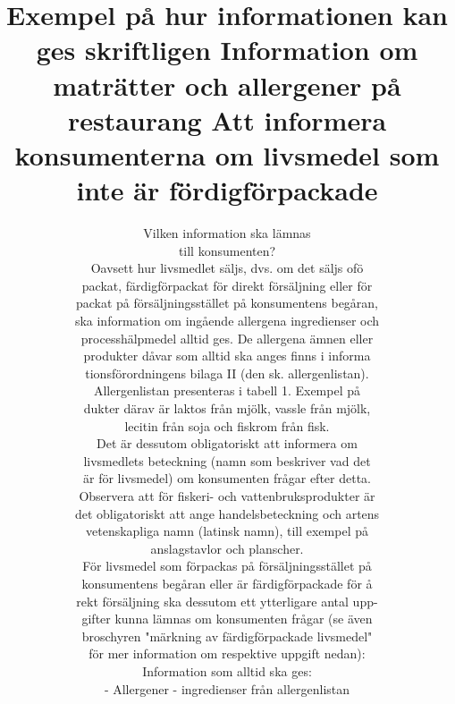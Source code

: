 \title{
Exempel på hur informationen kan ges skriftligen
}

\title{
Information om maträtter och allergener på restaurang
}

\title{
Att informera konsumenterna om livsmedel som inte är fördigförpackade
}
\author{
Vilken information ska lämnas \\ till konsumenten? \\ Oavsett hur livsmedlet säljs, dvs. om det säljs ofö \\ packat, färdigförpackat för direkt försäljning eller för \\ packat på försäljningsstället på konsumentens begåran, \\ ska information om ingående allergena ingredienser och \\ processhälpmedel alltid ges. De allergena ämnen eller \\ produkter dåvar som alltid ska anges finns i informa \\ tionsförordningens bilaga II (den sk. allergenlistan). \\ Allergenlistan presenteras i tabell 1. Exempel på \\ dukter därav är laktos från mjölk, vassle från mjölk, \\ lecitin från soja och fiskrom från fisk. \\ Det är dessutom obligatoriskt att informera om \\ livsmedlets beteckning (namn som beskriver vad det \\ är för livsmedel) om konsumenten frågar efter detta. \\ Observera att för fiskeri- och vattenbruksprodukter är \\ det obligatoriskt att ange handelsbeteckning och artens \\ vetenskapliga namn (latinsk namn), till exempel på \\ anslagstavlor och planscher. \\ För livsmedel som förpackas på försäljningsstället på \\ konsumentens begåran eller är färdigförpackade för å \\ rekt försäljning ska dessutom ett ytterligare antal upp- \\ gifter kunna lämnas om konsumenten frågar (se även \\ broschyren "märkning av färdigförpackade livsmedel" \\ för mer information om respektive uppgift nedan): \\ Information som alltid ska ges: \\ - Allergener - ingredienser från allergenlistan
}


